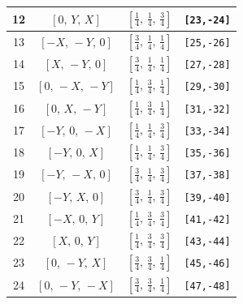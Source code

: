 \documentclass[fleqn,8pt]{jsarticle}
\begin{document}
\begin{longtable}{cccc}
12 & $\left[ 0,\, Y,\, X \right]$ & $\left[ \frac{1}{4},\, \frac{1}{4},\, \frac{3}{4} \right]$ & {\tt [23,-24]} \\ \hline
13 & $\left[ - X,\, - Y,\, 0 \right]$ & $\left[ \frac{3}{4},\, \frac{1}{4},\, \frac{1}{4} \right]$ & {\tt [25,-26]} \\ \hline
14 & $\left[ X,\, - Y,\, 0 \right]$ & $\left[ \frac{3}{4},\, \frac{1}{4},\, \frac{1}{4} \right]$ & {\tt [27,-28]} \\ \hline
15 & $\left[ 0,\, - X,\, - Y \right]$ & $\left[ \frac{1}{4},\, \frac{3}{4},\, \frac{1}{4} \right]$ & {\tt [29,-30]} \\ \hline
16 & $\left[ 0,\, X,\, - Y \right]$ & $\left[ \frac{1}{4},\, \frac{3}{4},\, \frac{1}{4} \right]$ & {\tt [31,-32]} \\ \hline
17 & $\left[ - Y,\, 0,\, - X \right]$ & $\left[ \frac{1}{4},\, \frac{1}{4},\, \frac{3}{4} \right]$ & {\tt [33,-34]} \\ \hline
18 & $\left[ - Y,\, 0,\, X \right]$ & $\left[ \frac{1}{4},\, \frac{1}{4},\, \frac{3}{4} \right]$ & {\tt [35,-36]} \\ \hline
19 & $\left[ - Y,\, - X,\, 0 \right]$ & $\left[ \frac{3}{4},\, \frac{1}{4},\, \frac{3}{4} \right]$ & {\tt [37,-38]} \\ \hline
20 & $\left[ - Y,\, X,\, 0 \right]$ & $\left[ \frac{3}{4},\, \frac{1}{4},\, \frac{3}{4} \right]$ & {\tt [39,-40]} \\ \hline
21 & $\left[ - X,\, 0,\, Y \right]$ & $\left[ \frac{1}{4},\, \frac{3}{4},\, \frac{3}{4} \right]$ & {\tt [41,-42]} \\ \hline
22 & $\left[ X,\, 0,\, Y \right]$ & $\left[ \frac{1}{4},\, \frac{3}{4},\, \frac{3}{4} \right]$ & {\tt [43,-44]} \\ \hline
23 & $\left[ 0,\, - Y,\, X \right]$ & $\left[ \frac{3}{4},\, \frac{3}{4},\, \frac{1}{4} \right]$ & {\tt [45,-46]} \\ \hline
24 & $\left[ 0,\, - Y,\, - X \right]$ & $\left[ \frac{3}{4},\, \frac{3}{4},\, \frac{1}{4} \right]$ & {\tt [47,-48]} \\
\end{longtable}
\renewcommand{\arraystretch}{1.2}
\end{document}
